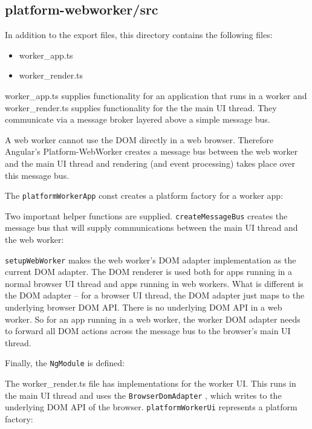 \subsection{platform-webworker/src}

In addition to the export files, this directory contains the following files:

\begin{itemize}
  \item worker\_app.ts
  \item worker\_render.ts
\end{itemize}

worker\_app.ts supplies functionality for an application that runs in a worker and
worker\_render.ts supplies functionality for the the main UI thread. They communicate
via a message broker layered above a simple message bus.

A web worker cannot use the DOM directly in a web browser. Therefore Angular’s
Platform-WebWorker creates a message bus between the web worker and the main UI
thread and rendering (and event processing) takes place over this message bus.

The
\texttt{platformWorkerApp}
const creates a platform factory for a worker app:



Two important helper functions are supplied.
\texttt{createMessageBus}
creates the message
bus that will supply communications between the main UI thread and the web worker:



\texttt{setupWebWorker}
makes the web worker’s DOM adapter implementation as the current
DOM adapter. The DOM renderer is used both for apps running in a normal browser UI
thread and apps running in web workers. What is different is the DOM adapter – for a
browser UI thread, the DOM adapter just maps to the underlying browser DOM API.
There is no underlying DOM API in a web worker. So for an app running in a web
worker, the worker DOM adapter needs to forward all DOM actions across the
message bus to the browser’s main UI thread.



Finally, the
\texttt{NgModule}
is defined:



The worker\_render.ts file has implementations for the worker UI. This runs in the
main UI thread and uses the
\texttt{BrowserDomAdapter}
, which writes to the underlying DOM
API of the browser.
\texttt{platformWorkerUi}
represents a platform factory:

